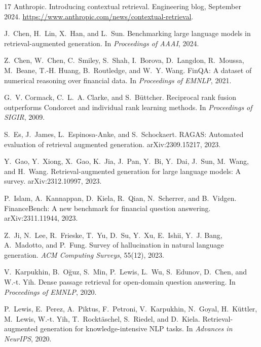 \documentclass[11pt,a4paper]{article}
\begin{document}

\begin{thebibliography}{17}
Anthropic. Introducing contextual retrieval. Engineering blog, September 2024.
\url{https://www.anthropic.com/news/contextual-retrieval}.

J.~Chen, H.~Lin, X.~Han, and L.~Sun. Benchmarking large language models in retrieval-augmented generation.
In \emph{Proceedings of AAAI}, 2024.

Z.~Chen, W.~Chen, C.~Smiley, S.~Shah, I.~Borova, D.~Langdon, R.~Moussa, M.~Beane, T.-H. Huang, B.~Routledge, and
W.~Y. Wang. FinQA: A dataset of numerical reasoning over financial data. In \emph{Proceedings of EMNLP}, 2021.

G.~V. Cormack, C.~L.~A. Clarke, and S.~B\"uttcher. Reciprocal rank fusion outperforms Condorcet and individual rank
learning methods. In \emph{Proceedings of SIGIR}, 2009.

S.~Es, J.~James, L.~Espinosa-Anke, and S.~Schockaert. RAGAS: Automated evaluation of retrieval augmented generation.
arXiv:2309.15217, 2023.

Y.~Gao, Y.~Xiong, X.~Gao, K.~Jia, J.~Pan, Y.~Bi, Y.~Dai, J.~Sun, M.~Wang, and H.~Wang. Retrieval-augmented generation
for large language models: A survey. arXiv:2312.10997, 2023.

P.~Islam, A.~Kannappan, D.~Kiela, R.~Qian, N.~Scherrer, and B.~Vidgen. FinanceBench: A new benchmark for financial
question answering. arXiv:2311.11944, 2023.

Z.~Ji, N.~Lee, R.~Frieske, T.~Yu, D.~Su, Y.~Xu, E.~Ishii, Y.~J. Bang, A.~Madotto, and P.~Fung. Survey of hallucination
in natural language generation. \emph{ACM Computing Surveys}, 55(12), 2023.

V.~Karpukhin, B.~O\u{g}uz, S.~Min, P.~Lewis, L.~Wu, S.~Edunov, D.~Chen, and W.-t. Yih. Dense passage retrieval for
open-domain question answering. In \emph{Proceedings of EMNLP}, 2020.

P.~Lewis, E.~Perez, A.~Piktus, F.~Petroni, V.~Karpukhin, N.~Goyal, H.~K\"uttler, M.~Lewis, W.-t. Yih,
T.~Rockt\"aschel, S.~Riedel, and D.~Kiela. Retrieval-augmented generation for knowledge-intensive NLP tasks.
In \emph{Advances in NeurIPS}, 2020.


\end{thebibliography}
\end{document}
